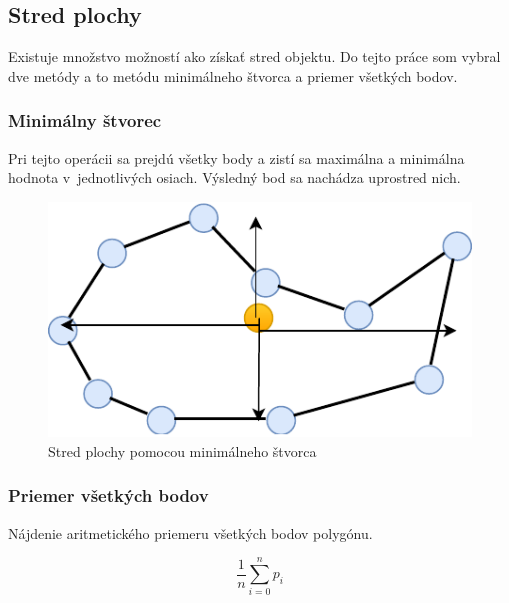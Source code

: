 \subsection*{Stred plochy}
Existuje množstvo možností ako získať stred objektu. Do tejto práce som vybral dve metódy a to metódu minimálneho štvorca a priemer všetkých bodov. %


\subsubsection{Minimálny štvorec}
Pri tejto operácii sa prejdú všetky body a zistí sa maximálna a minimálna hodnota v~jednotlivých osiach. Výsledný bod sa nachádza uprostred nich.


\begin{figure}[H]
	\centering
	\includegraphics[height=0.3\textwidth]{obrazky-figures/Diagram/Draw/1Points/DP Navrh operacii-0D - PointMiddle of surface.pdf}
	\caption{Stred plochy pomocou minimálneho štvorca }
	\label{fig:PointMiddleofsurface}
\end{figure}



\subsubsection{Priemer všetkých bodov}
Nájdenie aritmetického priemeru všetkých bodov polygónu.

\begin{equation}
    \frac{1}{n} \sum_{i=0}^{n} p_i   
    \label{eq:aritPriemer}
\end{equation}


